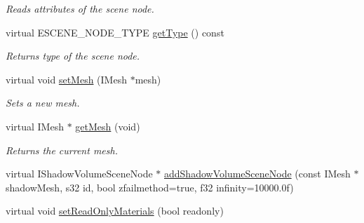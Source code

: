\begin{DoxyCompactItemize}
\begin{DoxyCompactList}\small\item\em Reads attributes of the scene node. \end{DoxyCompactList}\item 
\hypertarget{classirr_1_1scene_1_1_c_mesh_scene_node_acf234b00b713267b459c7ce1ab574c8b}{virtual E\-S\-C\-E\-N\-E\-\_\-\-N\-O\-D\-E\-\_\-\-T\-Y\-P\-E \hyperlink{classirr_1_1scene_1_1_c_mesh_scene_node_acf234b00b713267b459c7ce1ab574c8b}{get\-Type} () const }\label{classirr_1_1scene_1_1_c_mesh_scene_node_acf234b00b713267b459c7ce1ab574c8b}

\begin{DoxyCompactList}\small\item\em Returns type of the scene node. \end{DoxyCompactList}\item 
\hypertarget{classirr_1_1scene_1_1_c_mesh_scene_node_a02c897d8d373799736ba23f264636657}{virtual void \hyperlink{classirr_1_1scene_1_1_c_mesh_scene_node_a02c897d8d373799736ba23f264636657}{set\-Mesh} (I\-Mesh $\ast$mesh)}\label{classirr_1_1scene_1_1_c_mesh_scene_node_a02c897d8d373799736ba23f264636657}

\begin{DoxyCompactList}\small\item\em Sets a new mesh. \end{DoxyCompactList}\item 
\hypertarget{classirr_1_1scene_1_1_c_mesh_scene_node_ae3b39d252758b05067b48ea3fab5ef07}{virtual I\-Mesh $\ast$ \hyperlink{classirr_1_1scene_1_1_c_mesh_scene_node_ae3b39d252758b05067b48ea3fab5ef07}{get\-Mesh} (void)}\label{classirr_1_1scene_1_1_c_mesh_scene_node_ae3b39d252758b05067b48ea3fab5ef07}

\begin{DoxyCompactList}\small\item\em Returns the current mesh. \end{DoxyCompactList}\item 
virtual I\-Shadow\-Volume\-Scene\-Node $\ast$ \hyperlink{classirr_1_1scene_1_1_c_mesh_scene_node_aed0d03f177df8a6e2fad083b22238893}{add\-Shadow\-Volume\-Scene\-Node} (const I\-Mesh $\ast$shadow\-Mesh, s32 id, bool zfailmethod=true, f32 infinity=10000.\-0f)
\item 
\hypertarget{classirr_1_1scene_1_1_c_mesh_scene_node_a7c5227a399a31cef599a5f2c3c7045dd}{virtual void \hyperlink{classirr_1_1scene_1_1_c_mesh_scene_node_a7c5227a399a31cef599a5f2c3c7045dd}{set\-Read\-Only\-Materials} (bool readonly)}\label{classirr_1_1scene_1_1_c_mesh_scene_node_a7c5227a399a31cef599a5f2c3c7045dd}


\end{DoxyCompactItemize}
